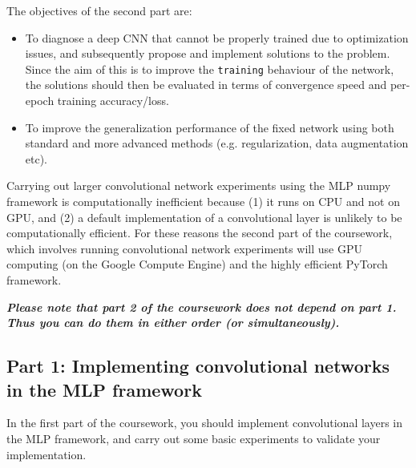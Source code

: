 \documentclass[11pt,]{article}
\begin{document}
The objectives of the second part are:
\begin{itemize}
    \item To diagnose a deep CNN that cannot be properly trained due to optimization issues, and subsequently propose and implement solutions to the problem. Since the aim of this is to improve the \texttt{training} behaviour of the network, the solutions should then be evaluated in terms of {convergence speed} and {per-epoch training accuracy/loss}.
    \item To improve the generalization performance of the fixed network using both standard and more advanced methods (e.g. regularization, data augmentation etc).
\end{itemize}

Carrying out larger convolutional network experiments using the MLP numpy framework is computationally inefficient because (1) it runs on CPU and not on GPU, and (2) a  default implementation of a convolutional layer is unlikely to be computationally efficient. For these reasons the second part of the coursework, which involves running convolutional network experiments will use GPU computing (on the Google Compute Engine) and the highly efficient PyTorch framework.

\textbf{\emph{Please note that part 2 of the coursework does not depend on part 1. \\
Thus you can do them in either order (or simultaneously).}}

\subsection{Part 1:  Implementing convolutional networks in the MLP framework}
\label{sec:mlp}
In the first part of the coursework, you should implement convolutional layers in the MLP framework, and carry out some basic experiments to validate your implementation.
\end{document}
